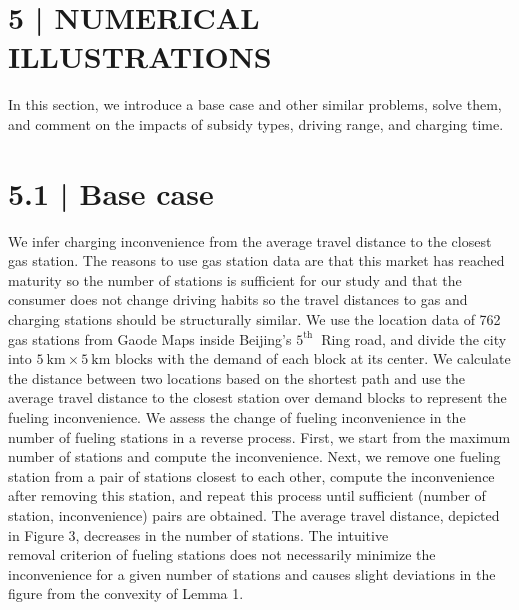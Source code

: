 \documentclass[10pt]{article}
\begin{document}
\section*{5 | NUMERICAL ILLUSTRATIONS}
In this section, we introduce a base case and other similar problems, solve them, and comment on the impacts of subsidy types, driving range, and charging time.

\section*{5.1 | Base case}
We infer charging inconvenience from the average travel distance to the closest gas station. The reasons to use gas station data are that this market has reached maturity so the number of stations is sufficient for our study and that the consumer does not change driving habits so the travel distances to gas and charging stations should be structurally similar. We use the location data of 762 gas stations from Gaode Maps inside Beijing's $5^{\text {th }}$ Ring road, and divide the city into $5 \mathrm{~km} \times 5 \mathrm{~km}$ blocks with the demand of each block at its center. We calculate the distance between two locations based on the shortest path and use the average travel distance to the closest station over demand blocks to represent the fueling inconvenience. We assess the change of fueling inconvenience in the number of fueling stations in a reverse process. First, we start from the maximum number of stations and compute the inconvenience. Next, we remove one fueling station from a pair of stations closest to each other, compute the inconvenience after removing this station, and repeat this process until sufficient (number of station, inconvenience) pairs are obtained. The average travel distance, depicted in Figure 3, decreases in the number of stations. The intuitive\\
removal criterion of fueling stations does not necessarily minimize the inconvenience for a given number of stations and causes slight deviations in the figure from the convexity of Lemma 1.
\end{document}
